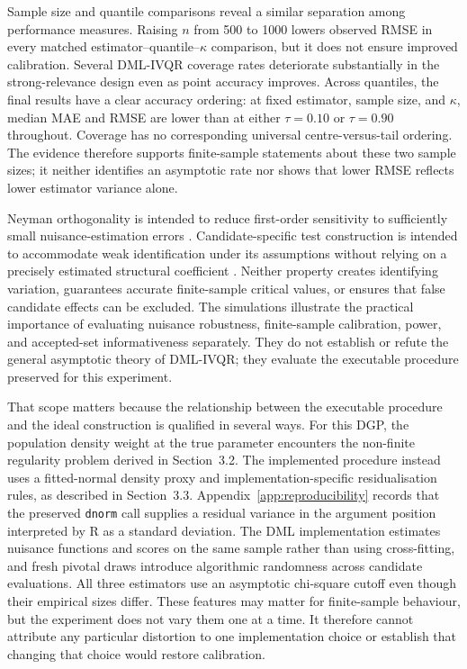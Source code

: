Sample size and quantile comparisons reveal a similar separation among performance measures. Raising $n$ from 500 to 1000 lowers observed RMSE in every matched estimator--quantile--$\kappa$ comparison, but it does not ensure improved calibration. Several DML-IVQR coverage rates deteriorate substantially in the strong-relevance design even as point accuracy improves. Across quantiles, the final results have a clear accuracy ordering: at fixed estimator, sample size, and $\kappa$, median MAE and RMSE are lower than at either $\tau=0.10$ or $\tau=0.90$ throughout. Coverage has no corresponding universal centre-versus-tail ordering. The evidence therefore supports finite-sample statements about these two sample sizes; it neither identifies an asymptotic rate nor shows that lower RMSE reflects lower estimator variance alone.

Neyman orthogonality is intended to reduce first-order sensitivity to sufficiently small nuisance-estimation errors \parencite{chernozhukov_et_al_2018}. Candidate-specific test construction is intended to accommodate weak identification under its assumptions without relying on a precisely estimated structural coefficient \parencite{chernozhukov_hansen_2008}. Neither property creates identifying variation, guarantees accurate finite-sample critical values, or ensures that false candidate effects can be excluded. The simulations illustrate the practical importance of evaluating nuisance robustness, finite-sample calibration, power, and accepted-set informativeness separately. They do not establish or refute the general asymptotic theory of DML-IVQR; they evaluate the executable procedure preserved for this experiment.

That scope matters because the relationship between the executable procedure and the ideal construction is qualified in several ways. For this DGP, the population density weight at the true parameter encounters the non-finite regularity problem derived in Section~3.2. The implemented procedure instead uses a fitted-normal density proxy and implementation-specific residualisation rules, as described in Section~3.3. Appendix~\ref{app:reproducibility} records that the preserved \texttt{dnorm} call supplies a residual variance in the argument position interpreted by R as a standard deviation. The DML implementation estimates nuisance functions and scores on the same sample rather than using cross-fitting, and fresh pivotal draws introduce algorithmic randomness across candidate evaluations. All three estimators use an asymptotic chi-square cutoff even though their empirical sizes differ. These features may matter for finite-sample behaviour, but the experiment does not vary them one at a time. It therefore cannot attribute any particular distortion to one implementation choice or establish that changing that choice would restore calibration.


